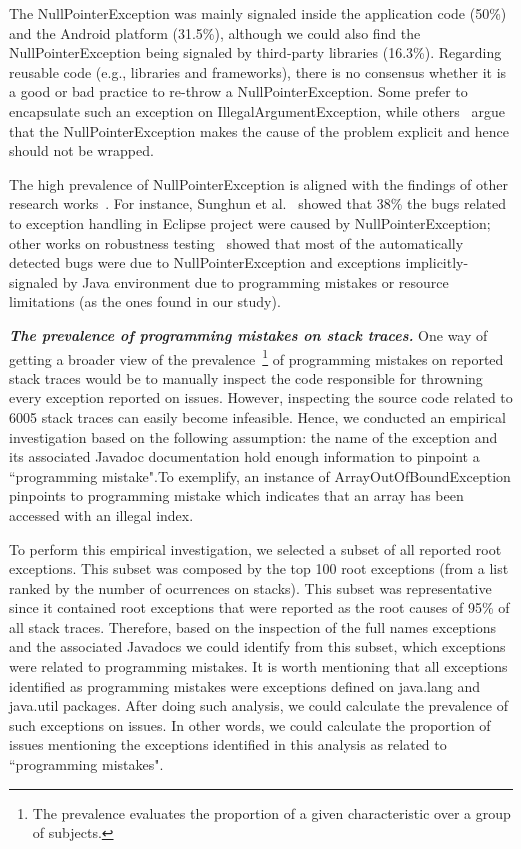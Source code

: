 \documentclass[conference]{IEEEtran}
\begin{document}
 The NullPointerException was mainly signaled inside the application code (50\%) and the Android platform (31.5\%),
 although we could also find the NullPointerException being signaled by third-party libraries (16.3\%). 
Regarding reusable code (e.g., libraries and frameworks), there is no consensus whether it is a good or bad practice to 
re-throw a NullPointerException. Some prefer to encapsulate such an exception on
IllegalArgumentException, while others~\cite{bloch2008effective} argue that the
NullPointerException makes the cause of the problem explicit and hence 
should not be wrapped.

The high prevalence of NullPointerException is aligned with the findings of other research
works~\cite{kim2013predicting,fraser20131600,csallner2004jcrasher}. For instance, Sunghun et
al.~\cite{kim2013predicting} showed that 38\% the bugs related to exception handling in Eclipse project
 were caused by NullPointerException; other works on robustness 
testing~\cite{maji2012empirical,csallner2004jcrasher} showed that most of the automatically 
detected bugs were due to NullPointerException and exceptions implicitly-signaled by Java 
environment due to programming mistakes or resource limitations
 (as the ones found in our study).

\emph{\textbf{The prevalence of programming mistakes on stack traces.}} One way of getting a broader view of the prevalence~\footnote{The prevalence evaluates the proportion of a given characteristic over a group of subjects.}  of programming mistakes on reported stack traces would be to manually inspect the code responsible for throwning every exception reported  on issues. However, inspecting the source code related to 6005 stack traces can easily become infeasible.
Hence, we conducted an empirical investigation based on the following assumption: the name of the exception and its associated Javadoc 
documentation hold enough information to pinpoint a ``programming mistake".To exemplify, an instance of ArrayOutOfBoundException
 pinpoints to programming mistake which indicates that an array has been accessed with an illegal index.

To perform this empirical investigation, we selected a subset of all reported root exceptions. 
This subset was composed by the top 100 root exceptions (from a list ranked by the number of ocurrences on stacks).
This subset was representative since it contained root exceptions that were reported as the root causes of 95\% of 
all stack traces. Therefore, based on the inspection of the full names exceptions and the associated 
 Javadocs we could identify from this subset, which exceptions were related to programming mistakes.
 It is worth mentioning that  all exceptions identified as programming mistakes were exceptions defined on java.lang and java.util packages. 
After doing such analysis, we could calculate the prevalence of such exceptions on issues. In other words, we could calculate the proportion of issues mentioning the exceptions identified in this analysis as related to ``programming mistakes".
\end{document}
